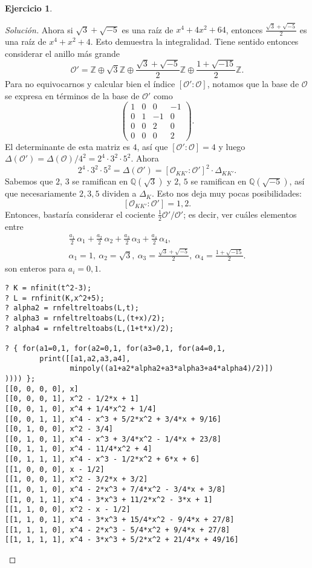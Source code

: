 \documentclass{article}
\newcounter{tarea}
\theoremstyle{definition}
\newtheorem{ejercicio}{Ejercicio}[tarea]
\newenvironment{solucion}{\begin{proof}[Solución]}{\end{proof}}
\newcommand{\ZZ}{\mathbb{Z}}
\newcommand{\QQ}{\mathbb{Q}}
\renewcommand{\O}{\mathcal{O}}
\begin{document}
\begin{ejercicio}
\begin{solucion}
    Ahora si $\sqrt{3} + \sqrt{-5}$ es una raíz de $x^4 + 4x^2 + 64$, entonces
    $\frac{\sqrt{3} + \sqrt{-5}}{2}$ es una raíz de $x^4 + x^2 + 4$. Esto
    demuestra la integralidad. Tiene sentido entonces considerar el anillo más
    grande
    $$\O' = \ZZ \oplus \sqrt{3}\ZZ \oplus \frac{\sqrt{3} + \sqrt{-5}}{2}\ZZ \oplus \frac{1 + \sqrt{-15}}{2}\ZZ.$$
    Para no equivocarnos y calcular bien el índice $[\O' : \O]$, notamos que la
    base de $\O$ se expresa en términos de la base de $\O'$ como
    \[ \begin{pmatrix}
      1 & 0 & 0 & -1 \\
      0 & 1 & -1 & 0 \\
      0 & 0 & 2 & 0 \\
      0 & 0 & 0 & 2
    \end{pmatrix}. \]
    El determinante de esta matriz es $4$, así que $[\O' : \O] = 4$ y luego
    $\Delta (\O') = \Delta (\O)/4^2 = 2^4\cdot 3^2\cdot 5^2$. Ahora
    $$2^4\cdot 3^2\cdot 5^2 = \Delta (\O') = [\O_{KK'} : \O']^2\cdot \Delta_{KK'}.$$
    Sabemos que $2$, $3$ se ramifican en $\QQ (\sqrt{3})$ y $2$, $5$ se
    ramifican en $\QQ (\sqrt{-5})$, así que necesariamente $2,3,5$ dividen a
    $\Delta_K$. Esto nos deja muy pocas posibilidades:
    $$[\O_{KK'} : \O'] = 1, 2.$$
    Entonces, bastaría considerar el cociente $\frac{1}{2}\O'/\O'$; es decir,
    ver cuáles elementos entre
    \begin{gather*}
      \frac{a_1}{2}\,\alpha_1 + \frac{a_2}{2}\,\alpha_2 + \frac{a_3}{2}\,\alpha_3 + \frac{a_4}{2}\,\alpha_4,\\
      \alpha_1 = 1, ~
      \alpha_2 = \sqrt{3}, ~
      \alpha_3 = \frac{\sqrt{3} + \sqrt{-5}}{2}, ~
      \alpha_4 = \frac{1 + \sqrt{-15}}{2}.
    \end{gather*}
    son enteros para $a_i = 0,1$.
    \begin{framed}\small
\begin{verbatim}
? K = nfinit(t^2-3);
? L = rnfinit(K,x^2+5);
? alpha2 = rnfeltreltoabs(L,t);
? alpha3 = rnfeltreltoabs(L,(t+x)/2);
? alpha4 = rnfeltreltoabs(L,(1+t*x)/2);

? { for(a1=0,1, for(a2=0,1, for(a3=0,1, for(a4=0,1,
        print([[a1,a2,a3,a4],
               minpoly((a1+a2*alpha2+a3*alpha3+a4*alpha4)/2)])
)))) };
[[0, 0, 0, 0], x]
[[0, 0, 0, 1], x^2 - 1/2*x + 1]
[[0, 0, 1, 0], x^4 + 1/4*x^2 + 1/4]
[[0, 0, 1, 1], x^4 - x^3 + 5/2*x^2 + 3/4*x + 9/16]
[[0, 1, 0, 0], x^2 - 3/4]
[[0, 1, 0, 1], x^4 - x^3 + 3/4*x^2 - 1/4*x + 23/8]
[[0, 1, 1, 0], x^4 - 11/4*x^2 + 4]
[[0, 1, 1, 1], x^4 - x^3 - 1/2*x^2 + 6*x + 6]
[[1, 0, 0, 0], x - 1/2]
[[1, 0, 0, 1], x^2 - 3/2*x + 3/2]
[[1, 0, 1, 0], x^4 - 2*x^3 + 7/4*x^2 - 3/4*x + 3/8]
[[1, 0, 1, 1], x^4 - 3*x^3 + 11/2*x^2 - 3*x + 1]
[[1, 1, 0, 0], x^2 - x - 1/2]
[[1, 1, 0, 1], x^4 - 3*x^3 + 15/4*x^2 - 9/4*x + 27/8]
[[1, 1, 1, 0], x^4 - 2*x^3 - 5/4*x^2 + 9/4*x + 27/8]
[[1, 1, 1, 1], x^4 - 3*x^3 + 5/2*x^2 + 21/4*x + 49/16]
\end{verbatim}
    \end{framed}


\end{solucion}
\end{ejercicio}
\end{document}
